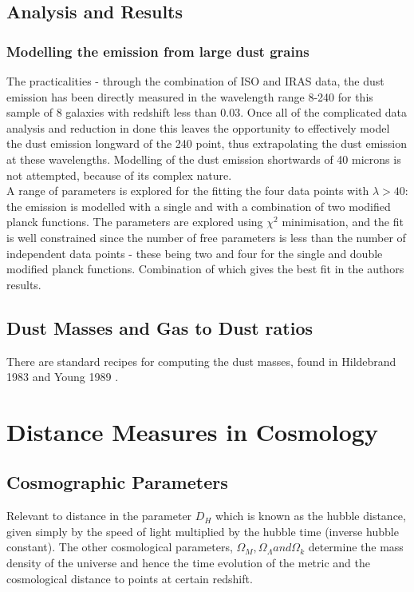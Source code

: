\documentclass{literature}
\begin{document}
\subsection{Analysis and Results}
\subsubsection{Modelling the emission from large dust grains}
The practicalities - through the combination of ISO and IRAS data, the dust emission has been directly measured in the wavelength range 8-240 for this sample of 8 galaxies with redshift less than 0.03. Once all of the complicated data analysis and reduction in done this leaves the opportunity to effectively model the dust emission longward of the 240 point, thus extrapolating the dust emission at these wavelengths. Modelling of the dust emission shortwards of 40 microns is not attempted, because of its complex nature. \\ 
A range of parameters is explored for the fitting the four data points with $\lambda > 40$: the emission is modelled with a single and with a combination of two modified planck functions. The parameters are explored using $\chi ^{2}$ minimisation, and the fit is well constrained since the number of free parameters is less than the number of independent data points - these being two and four for the single and double modified planck functions. Combination of which gives the best fit in the authors results. 

\subsection{Dust Masses and Gas to Dust ratios}
There are standard recipes for computing the dust masses, found in Hildebrand 1983 \citep{Hildebrand_1983} and Young 1989 \citep{Young_1989}.  








\section{Distance Measures in Cosmology}\label{sec:cosmology_distance}
\subsection{Cosmographic Parameters}
Relevant to distance in the parameter $D_{H}$ which is known as the hubble distance, given simply by the speed of light multiplied by the hubble time (inverse hubble constant). The other cosmological parameters, $\Omega_{M}, \Omega_{\Lambda} and \Omega_{k}$ determine the mass density of the universe and hence the time evolution of the metric and the cosmological distance to points at certain redshift.
\end{document}
